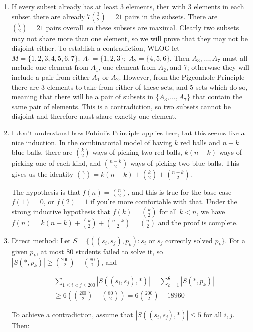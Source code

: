 \documentclass{book}
\numberwithin{equation}{section}
\begin{document}
\begin{enumerate}[label={7.\arabic*}]
\item
If every subset already has at least 3 elements, then with 3 elements in each subset there are already
$7{3 \choose 2} = 21$ pairs in the subsets. There are ${7 \choose 2} = 21$ pairs overall, so these subsets
are maximal. Clearly two subsets may not share more than one element, so we will prove that they may
not be disjoint either. To establish a contradiction, WLOG let $M = \{ 1, 2, 3, 4, 5, 6, 7 \}; \; A_1 = \{ 1, 2, 3 \}; \;
A_2 = \{ 4, 5, 6 \}$. Then $A_3, \ldots, A_7$ must all include one element from $A_1$, one element from $A_2$, and 7;
otherwise they will include a pair from either $A_1$ or $A_2$. However, from the Pigeonhole Principle there are
3 elements to take from either of these sets, and 5 sets which do so, meaning that there will be a pair of subsets
in $\{ A_3, \ldots, A_7 \}$ that contain the same pair of elements. This is a contradiction, so two subsets cannot
be disjoint and therefore must share exactly one element.

\item
I don't understand how Fubini's Principle applies here, but this seems like a nice induction. In the combinatorial
model of having $k$ red balls and $n-k$ blue balls, there are ${k \choose 2}$ ways of picking two red balls,
$k(n-k)$ ways of picking one of each kind, and ${n-k \choose 2}$ ways of picking two blue balls. This gives us
the identity ${n \choose 2} = k(n-k) + {k \choose 2} + {n-k \choose 2}$.

The hypothesis is that $f(n) = {n \choose 2}$, and this is true for the base case $f(1) = 0$, or $f(2) = 1$ if you're
more comfortable with that. Under the strong inductive hypothesis that $f(k) = {k \choose 2}$ for all $k < n$,
we have $f(n) = k(n-k) + {k \choose 2} + {n-k \choose 2} = {n \choose 2}$ and the proof is complete.

\item
Direct method: Let $S = \{ \left( (s_i, s_j), p_k \right) : s_i \text{ or } s_j \text{ correctly solved } p_k \}$.
For a given $p_k$, at most 80 students failed to solve it, so $|S(*, p_k)| \geq {200 \choose 2} - {80 \choose 2}$, and

\begin{align*}
& \sum_{1 \leq i < j \leq 200} |S \left( (s_i, s_j), * \right)| = \sum_{k=1}^6 |S(*, p_k)| \\
& \geq 6\left( {200 \choose 2} - {80 \choose 2} \right) = 6{200 \choose 2} - 18960
\end{align*}

To achieve a contradiction, assume that $|S\left( (s_i, s_j), * \right)| \leq 5$ for all $i, j$. Then:


\end{enumerate}
\end{document}
